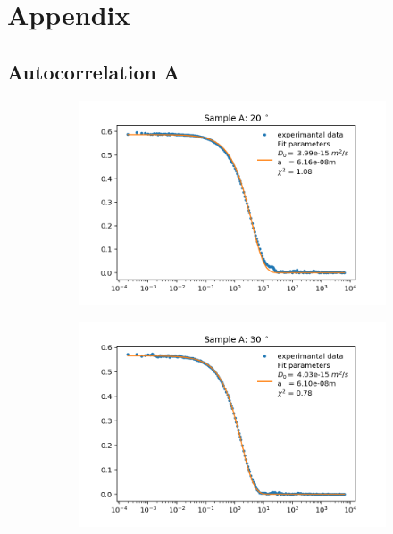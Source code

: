 \documentclass[]{article}
\begin{document}
\newpage
\newpage
\section{Appendix}

\subsection{Autocorrelation A}
\label{autocorr A}
\begin{figure}[!h]
\centering

\begin{subfigure}{0.48\textwidth}
\includegraphics[width=\linewidth]{Plots/A/20.png}
\end{subfigure}
\begin{subfigure}[c]{0.48\linewidth}
\includegraphics[width=\linewidth]{Plots/A/30.png}
\end{subfigure}


\end{figure}
\end{document}
